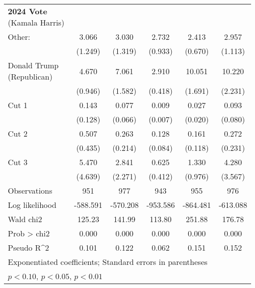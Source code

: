 \begin{table}[htbp]
\begin{tabular}{l*{5}{c}}
\textbf{2024 Vote} (Kamala Harris) &  &  &  &   & \\
Other:              &       3.066\sym{***}&       3.030\sym{**} &       2.732\sym{***}&       2.413\sym{***}&       2.957\sym{***}\\
                    &     (1.249)         &     (1.319)         &     (0.933)         &     (0.670)         &     (1.113)         \\

Donald Trump (Republican)&       4.670\sym{***}&       7.061\sym{***}&       2.910\sym{***}&      10.051\sym{***}&      10.220\sym{***}\\
                    &     (0.946)         &     (1.582)         &     (0.418)         &     (1.691)         &     (2.231)         \\
Cut 1               &       0.143\sym{**} &       0.077\sym{***}&       0.009\sym{***}&       0.027\sym{***}&       0.093\sym{***}\\
                    &     (0.128)         &     (0.066)         &     (0.007)         &     (0.020)         &     (0.080)         \\
Cut 2               &       0.507         &       0.263         &       0.128\sym{***}&       0.161\sym{**} &       0.272         \\
                    &     (0.435)         &     (0.214)         &     (0.084)         &     (0.118)         &     (0.231)         \\
Cut 3               &       5.470\sym{**} &       2.841         &       0.625         &       1.330         &       4.280\sym{*}  \\
                    &     (4.639)         &     (2.271)         &     (0.412)         &     (0.976)         &     (3.567)         \\
\hline
Observations        &         951         &         977         &         943         &         955         &         976         \\
Log likelihood      &    -588.591         &    -570.208         &    -953.586         &    -864.481         &    -613.088         \\
Wald chi2           &      125.23         &      141.99         &      113.80         &      251.88         &      176.78         \\
Prob > chi2         &       0.000         &       0.000         &       0.000         &       0.000         &       0.000         \\
Pseudo R^2          &       0.101         &       0.122         &       0.062         &       0.151         &       0.152         \\
\hline\hline
\multicolumn{6}{l}{\footnotesize Exponentiated coefficients; Standard errors in parentheses}\\
\multicolumn{6}{l}{\footnotesize \sym{*} \(p<0.10\), \sym{**} \(p<0.05\), \sym{***} \(p<0.01\)}\\
\end{tabular}
\end{table}

